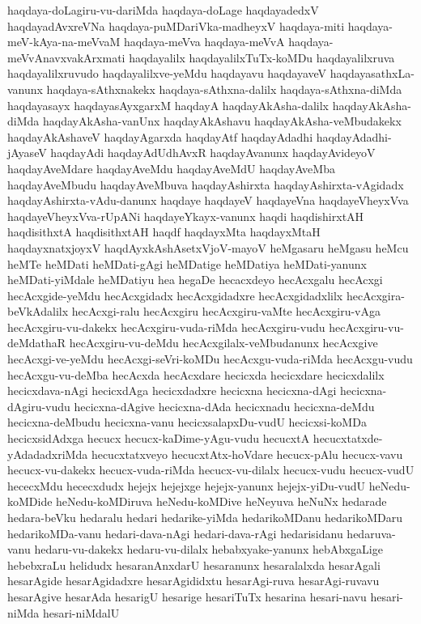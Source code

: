 {haqdaya-doLagiru-vu-dariMda
haqdaya-doLage
haqdayadedxV
haqdayadAvxreVNa
haqdaya-puMDariVka-madheyxV
haqdaya-miti
haqdaya-meV-kAya-na-meVvaM
haqdaya-meVva
haqdaya-meVvA
haqdaya-meVvAnavxvakArxmati
haqdayalilx
haqdayalilxTuTx-koMDu
haqdayalilxruva
haqdayalilxruvudo
haqdayalilxve-yeMdu
haqdayavu
haqdayaveV
haqdayasathxLa-vanunx
haqdaya-sAthxnakekx
haqdaya-sAthxna-dalilx
haqdaya-sAthxna-diMda
haqdayasayx
haqdayasAyxgarxM
haqdayA
haqdayAkAsha-dalilx
haqdayAkAsha-diMda
haqdayAkAsha-vanUnx
haqdayAkAshavu
haqdayAkAsha-veMbudakekx
haqdayAkAshaveV
haqdayAgarxda
haqdayAtf
haqdayAdadhi
haqdayAdadhi-jAyaseV
haqdayAdi
haqdayAdUdhAvxR
haqdayAvanunx
haqdayAvideyoV
haqdayAveMdare
haqdayAveMdu
haqdayAveMdU
haqdayAveMba
haqdayAveMbudu
haqdayAveMbuva
haqdayAshirxta
haqdayAshirxta-vAgidadx
haqdayAshirxta-vAdu-danunx
haqdaye
haqdayeV
haqdayeVna
haqdayeVheyxVva
haqdayeVheyxVva-rUpANi
haqdayeYkayx-vanunx
haqdi
haqdishirxtAH
haqdisithxtA
haqdisithxtAH
haqdf
haqdayxMta
haqdayxMtaH
haqdayxnatxjoyxV
haqdAyxkAshAsetxVjoV-mayoV
heMgasaru
heMgasu
heMcu
heMTe
heMDati
heMDati-gAgi
heMDatige
heMDatiya
heMDati-yanunx
heMDati-yiMdale
heMDatiyu
hea
hegaDe
hecacxdeyo
hecAcxgalu
hecAcxgi
hecAcxgide-yeMdu
hecAcxgidadx
hecAcxgidadxre
hecAcxgidadxlilx
hecAcxgira-beVkAdalilx
hecAcxgi-ralu
hecAcxgiru
hecAcxgiru-vaMte
hecAcxgiru-vAga
hecAcxgiru-vu-dakekx
hecAcxgiru-vuda-riMda
hecAcxgiru-vudu
hecAcxgiru-vu-deMdathaR
hecAcxgiru-vu-deMdu
hecAcxgilalx-veMbudanunx
hecAcxgive
hecAcxgi-ve-yeMdu
hecAcxgi-seVri-koMDu
hecAcxgu-vuda-riMda
hecAcxgu-vudu
hecAcxgu-vu-deMba
hecAcxda
hecAcxdare
hecicxda
hecicxdare
hecicxdalilx
hecicxdava-nAgi
hecicxdAga
hecicxdadxre
hecicxna
hecicxna-dAgi
hecicxna-dAgiru-vudu
hecicxna-dAgive
hecicxna-dAda
hecicxnadu
hecicxna-deMdu
hecicxna-deMbudu
hecicxna-vanu
hecicxsalapxDu-vudU
hecicxsi-koMDa
hecicxsidAdxga
hecucx
hecucx-kaDime-yAgu-vudu
hecucxtA
hecucxtatxde-yAdadadxriMda
hecucxtatxveyo
hecucxtAtx-hoVdare
hecucx-pAlu
hecucx-vavu
hecucx-vu-dakekx
hecucx-vuda-riMda
hecucx-vu-dilalx
hecucx-vudu
hecucx-vudU
hececxMdu
hececxdudx
hejejx
hejejxge
hejejx-yanunx
hejejx-yiDu-vudU
heNedu-koMDide
heNedu-koMDiruva
heNedu-koMDive
heNeyuva
heNuNx
hedarade
hedara-beVku
hedaralu
hedari
hedarike-yiMda
hedarikoMDanu
hedarikoMDaru
hedarikoMDa-vanu
hedari-dava-nAgi
hedari-dava-rAgi
hedarisidanu
hedaruva-vanu
hedaru-vu-dakekx
hedaru-vu-dilalx
hebabxyake-yanunx
hebAbxgaLige
hebebxraLu
helidudx
hesaranAnxdarU
hesaranunx
hesaralalxda
hesarAgali
hesarAgide
hesarAgidadxre
hesarAgididxtu
hesarAgi-ruva
hesarAgi-ruvavu
hesarAgive
hesarAda
hesarigU
hesarige
hesariTuTx
hesarina
hesari-navu
hesari-niMda
hesari-niMdalU
}
